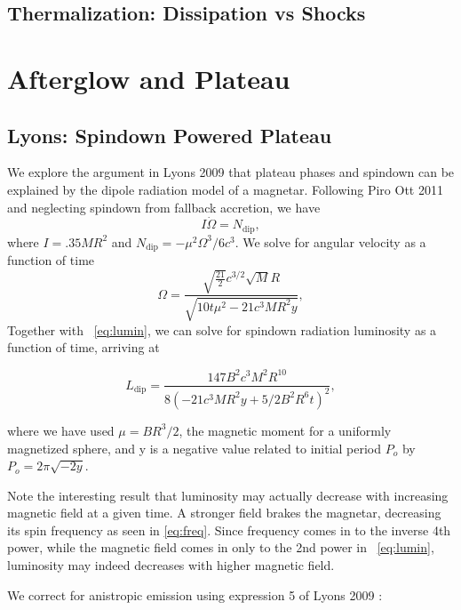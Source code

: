 \documentclass{article}
\begin{document}
\subsection{Thermalization: Dissipation vs Shocks}

\section{Afterglow and Plateau}

\subsection{Lyons: Spindown Powered Plateau}
We explore the argument in Lyons 2009 \cite{Lyons:2009ka} that plateau phases and spindown can be explained by the dipole radiation model of a magnetar.
Following Piro Ott 2011\cite{Piro:2011ed} and neglecting spindown from fallback accretion, we have
\begin{equation} I \dot{\Omega}=N_{\mathrm{dip}}, \end{equation}
where $I= .35 M R^2$ and $N_{\mathrm{dip}}= -\mu ^2 \Omega^3/6c^3$.
We solve for angular velocity as a function of time
\begin{equation}\label{eq:freq}
\Omega = \frac{\sqrt{\frac{21}{2}} c^{3/2} \sqrt{M} R}{\sqrt{10 t\mu^2 - 21 c^3 M R^2 y}},
\end{equation}
Together with ~\ref{eq:lumin}, we can solve for spindown radiation luminosity as a function of time, arriving at

\begin{equation}
L_{\mathrm{dip}}=\frac{147 B^2 c^3 M^2 R^{10}}{8(-21 c^3 M R^2 y+ 5/2 B^2 R^6 t)^2},
\end{equation}

where we have used $\mu= B R^3/2$, the magnetic moment for a uniformly magnetized sphere, and y is a negative value related to initial period $P_o$ by $P_o= 2\pi \sqrt{-2 y}$.

\hspace{4cm}

Note  the interesting result that luminosity may actually decrease with increasing magnetic field at a given time. A stronger field brakes the magnetar, decreasing its spin frequency as seen in \ref{eq:freq}. Since frequency comes in to the inverse 4th power, while the magnetic field comes in only to the 2nd power in ~\ref{eq:lumin}, luminosity may indeed decreases with higher magnetic field.

We correct for anistropic emission using expression 5 of Lyons 2009 \cite{Lyons:2009ka}:
\end{document}
